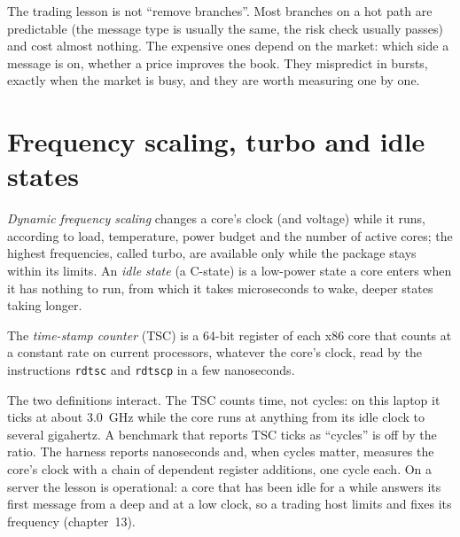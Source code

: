 The trading lesson is not ``remove branches''. Most branches on a hot path are predictable (the message type is
usually the same, the risk check usually passes) and cost almost nothing. The expensive ones depend on the market:
which side a message is on, whether a price improves the book. They mispredict in bursts, exactly when the market is
busy, and they are worth measuring one by one.

\section{Frequency scaling, turbo and idle states}

\begin{definition}\label{def:ll:cpu-microarchitecture:dvfs}
\emph{Dynamic frequency scaling} changes a core's clock (and voltage) while it runs,
according to load, temperature, power budget and the number of active cores; the highest frequencies, called turbo,
are available only while the package stays within its limits. An \emph{idle state} (a C-state) is a
low-power state a core enters when it has nothing to run, from which it takes microseconds to wake, deeper states
taking longer.
\end{definition}

\begin{definition}\label{def:ll:cpu-microarchitecture:tsc}
The \emph{time-stamp counter} (TSC) is a 64-bit register of each x86 core that counts at a
constant rate on current processors, whatever the core's clock, read by the instructions \texttt{rdtsc} and
\texttt{rdtscp} in a few nanoseconds.
\end{definition}

The two definitions interact. The TSC counts time, not cycles: on this laptop it ticks at about 3.0~GHz while the core
runs at anything from its idle clock to several gigahertz. A benchmark that reports TSC ticks as ``cycles'' is off by
the ratio. The harness reports nanoseconds and, when cycles matter, measures the core's clock with a chain of dependent
register additions, one cycle each. On a server the lesson is operational: a core that has been idle for a while
answers its first message from a deep  and at a low clock, so a trading host limits  and fixes
its frequency (chapter~13).

